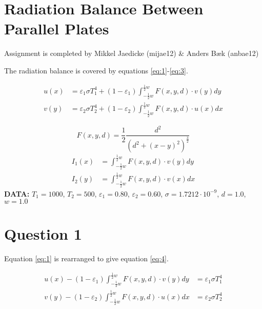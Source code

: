 \section*{Radiation Balance Between Parallel Plates}
Assignment is completed by Mikkel Jaedicke (mijae12) \& Anders Bæk (anbae12)

The radiation balance is covered by equations \ref{eq:1}-\ref{eq:3}. 

\begin{equation}
\begin{align*}
u\left( x \right) &=\varepsilon _{ 1 }\sigma { T }_{ 1 }^{ 4 }+\left( 1-\varepsilon _{ 1 } \right) \int _{ -\frac { 1 }{ 2 } w }^{ \frac { 1 }{ 2 } w } F\left( x,y,d \right) \cdot v\left( y \right) { dy }\\ 
v\left( y \right) &=\varepsilon _{ 2 }\sigma { T }_{ 2 }^{ 4 }+\left( 1-\varepsilon _{ 2 } \right) \int _{ -\frac { 1 }{ 2 } w }^{ \frac { 1 }{ 2 } w } F\left( x,y,d \right) \cdot u\left( x \right) { dx }
\end{align*}
\label{eq:1}
\end{equation}


\begin{equation}
F\left( x,y,d \right) =  \frac {1}{2}\frac { d^2 }{ \left( d^2+\left( x-y \right)^2 \right)^{\frac{3}{2}}} 
\label{eq:2}
\end{equation}
\begin{equation}
\begin{align*}
I_{ 1 }\left( x \right) &=\int _{ -\frac { 1 }{ 2 } w }^{ \frac { 1 }{ 2 } w } F\left( x,y,d \right)\cdot v\left( y \right) { dy }
\\
I_{ 2 }\left( y \right) &=\int _{ -\frac { 1 }{ 2 } w }^{ \frac { 1 }{ 2 } w } F\left( x,y,d \right)\cdot v\left( x \right) { dx }
\end{align*}
\label{eq:3}
\end{equation}
\textbf{DATA:} \( T_1 = 1000\), \(  T_2=500 \), \(  \varepsilon_1 = 0.80 \), \(  \varepsilon_2 = 0.60 \), \(  \sigma = 1.7212\cdot 10^{-9} \), \( d=1.0  \), \(  w=1.0 \)
\section*{Question 1}

Equation \ref{eq:1} is rearranged to give equation \ref{eq:4}.

\begin{equation}
\begin{align*}
u\left( x \right)- \left( 1-\varepsilon _{ 1 } \right) \int _{ -\frac { 1 }{ 2 } w }^{ \frac { 1 }{ 2 } w } F\left( x,y,d \right) \cdot v\left( y \right) { dy } &=\varepsilon _{ 1 }\sigma { T }_{ 1 }^{ 4 }\\ 
v\left( y \right) -\left( 1-\varepsilon _{ 2 } \right) \int _{ -\frac { 1 }{ 2 } w }^{ \frac { 1 }{ 2 } w } F\left( x,y,d \right) \cdot u\left( x \right) { dx } &=\varepsilon _{ 2 }\sigma { T }_{ 2 }^{ 4 }
\end{align*}
\label{eq:4}
\end{equation}

